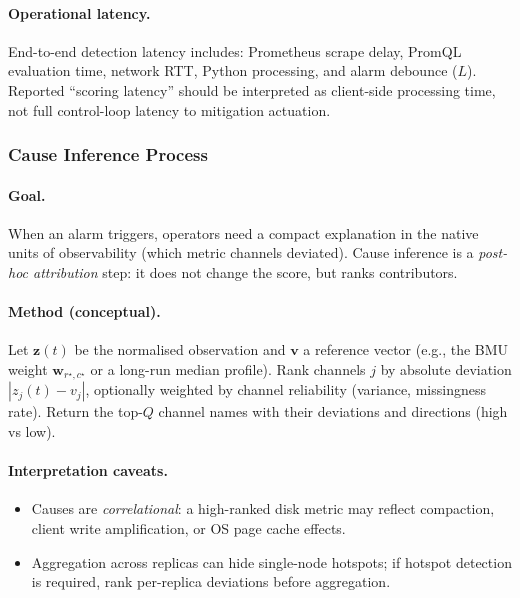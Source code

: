 \documentclass[11pt,a4paper]{article}
\begin{document}
\paragraph{Operational latency.}
End-to-end detection latency includes: Prometheus scrape delay, PromQL evaluation time, network RTT, Python processing, and alarm debounce ($L$). Reported ``scoring latency'' should be interpreted as client-side processing time, not full control-loop latency to mitigation actuation.

\subsubsection{Cause Inference Process}
\label{subsubsec:cause-inference}

\paragraph{Goal.}
When an alarm triggers, operators need a compact explanation in the native units of observability (which metric channels deviated). Cause inference is a \emph{post-hoc attribution} step: it does not change the score, but ranks contributors.

\paragraph{Method (conceptual).}
Let $\mathbf{z}(t)$ be the normalised observation and $\mathbf{v}$ a reference vector (e.g., the BMU weight $\mathbf{w}_{r^\star,c^\star}$ or a long-run median profile). Rank channels $j$ by absolute deviation $|z_j(t)-v_j|$, optionally weighted by channel reliability (variance, missingness rate). Return the top-$Q$ channel names with their deviations and directions (high vs low).

\paragraph{Interpretation caveats.}
\begin{itemize}[leftmargin=*]
  \item Causes are \emph{correlational}: a high-ranked disk metric may reflect compaction, client write amplification, or OS page cache effects.
  \item Aggregation across replicas can hide single-node hotspots; if hotspot detection is required, rank per-replica deviations before aggregation.
\end{itemize}
\end{document}
